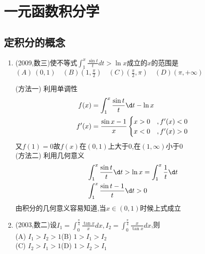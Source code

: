 \documentclass[12pt, a4paper, oneside, UTF8]{ctexbook}
\begin{document}

\else
\fi

\chapter{一元函数积分学}
\section{ 定积分的概念}

\begin{enumerate}[label=\arabic*.,start=2]
    \item (2009,数三)使不等式$\int_1^x\frac{\sin t}{t} dt>\ln x$成立的$x$的范围是 \\
        $(A)\ (0,1)\quad(B)\left(1,\frac{\pi}{2}\right)\quad
        (C)\left(\frac{\pi}{2},\pi\right)\quad(D)(\pi,+\infty)$
    
    \begin{solution}
    (方法一) 利用单调性
    \begin{align*}
        f(x)  &= \int_{1}^{x}\frac{\sin{t}}{t}\d t -\ln{x} \\
        f'(x) &= \frac{\sin{x} - 1}{x}\begin{cases}
            x > 0 &, f'(x) < 0 \\
            x < 0 &, f'(x) > 0
        \end{cases}
    \end{align*}
    又$f(1)=0$故$f(x)$在$(0,1)$上大于0,在$(1,\infty)$小于0 \\
    (方法二) 利用几何意义 
    \begin{align*}
        &\int_{1}^{x}\frac{\sin t}{t}\d t > \ln{x} = \int_{1}^{x}\frac{1}{t}\d t \\
        &\int_{1}^{x}\frac{\sin{t} - 1}{t}\d t > 0
    \end{align*}
    由积分的几何意义容易知道,当$x\in(0,1)$时候上式成立
    \end{solution}
    
    \item (2003,数二)设$I_1=\int_0^{\frac{\pi}{4}}\frac{\tan x}{x} dx, 
    I_2=\int_0^{\frac{\pi}{4}}\frac{x}{\tan x} dx$,则 \\
    (A) $I_1>I_2>1$\quad(B) $1>I_1>I_2$ \\
    (C) $I_2>I_1>1$\quad(D) $1>I_2>I_1$
    

\end{enumerate}
\end{document}
